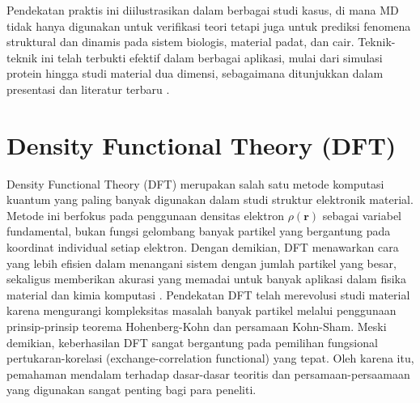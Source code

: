 Pendekatan praktis ini diilustrasikan dalam berbagai studi kasus, di mana MD tidak hanya digunakan untuk verifikasi teori tetapi juga untuk prediksi fenomena struktural dan dinamis pada sistem biologis, material padat, dan cair.
Teknik-teknik ini telah terbukti efektif dalam berbagai aplikasi, mulai dari simulasi protein hingga studi material dua dimensi, sebagaimana ditunjukkan dalam presentasi dan literatur terbaru \citep{Rapaport2004}.

\section{Density Functional Theory (DFT)}
Density Functional Theory (DFT) merupakan salah satu metode komputasi kuantum yang paling banyak digunakan dalam studi struktur elektronik material.
Metode ini berfokus pada penggunaan densitas elektron \(\rho(\mathbf{r})\) sebagai variabel fundamental, bukan fungsi gelombang banyak partikel yang bergantung pada koordinat individual setiap elektron.
Dengan demikian, DFT menawarkan cara yang lebih efisien dalam menangani sistem dengan jumlah partikel yang besar, sekaligus memberikan akurasi yang memadai untuk banyak aplikasi dalam fisika material dan kimia komputasi \citep{Kohn1965, Martin2004}.
Pendekatan DFT telah merevolusi studi material karena mengurangi kompleksitas masalah banyak partikel melalui penggunaan prinsip-prinsip teorema Hohenberg-Kohn dan persamaan Kohn-Sham.
Meski demikian, keberhasilan DFT sangat bergantung pada pemilihan fungsional pertukaran-korelasi (exchange-correlation functional) yang tepat.
Oleh karena itu, pemahaman mendalam terhadap dasar-dasar teoritis dan persamaan-persaamaan yang digunakan sangat penting bagi para peneliti.

